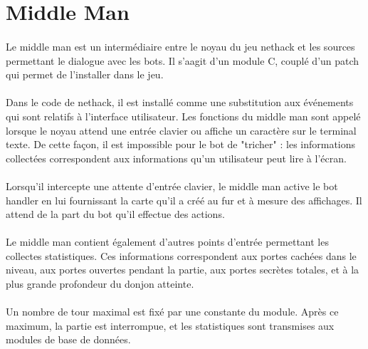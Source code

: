 \section{Middle Man}
\paragraph{}
Le middle man est un intermédiaire entre le noyau du jeu nethack
et les sources permettant le dialogue avec les bots. Il s'aagit d'un module C,
couplé d'un patch qui permet de l'installer dans le jeu.

\paragraph{}
Dans le code de nethack,
il est installé comme une substitution aux événements qui sont relatifs
à l'interface utilisateur. Les fonctions du middle man sont appelé lorsque le
noyau attend une entrée clavier ou affiche un caractère sur le terminal texte.
De cette façon, il est impossible pour le bot de "tricher" : les informations 
collectées correspondent aux informations qu'un utilisateur peut lire à l'écran.

\paragraph{}
Lorsqu'il intercepte une attente d'entrée clavier, le middle man active le
bot handler en lui fournissant la carte qu'il a créé au fur et à mesure des affichages.
Il attend de la part du bot qu'il effectue des actions. 

\paragraph{}
Le middle man contient également d'autres points d'entrée permettant les collectes 
statistiques. Ces informations correspondent aux portes cachées dans le niveau, aux portes
ouvertes pendant la partie, aux portes secrètes totales, et à la plus grande
profondeur du donjon atteinte.

\paragraph{}
Un nombre de tour maximal est fixé par une constante du module.
Après ce maximum, la partie est interrompue, et les statistiques sont transmises aux modules de
base de données.

